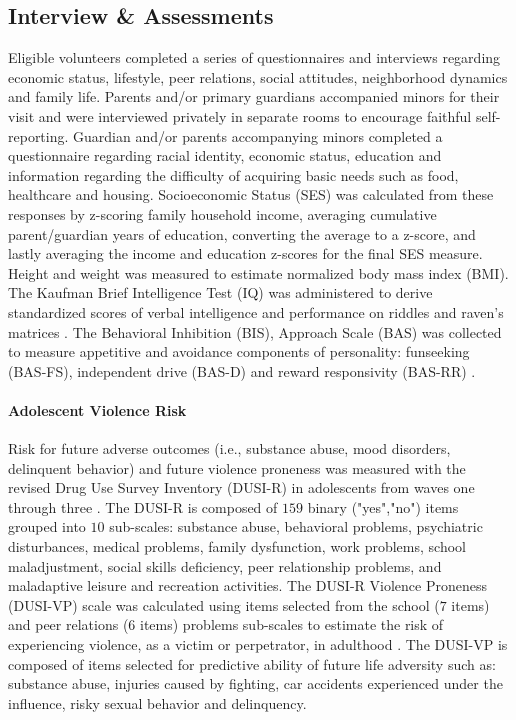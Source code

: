 \documentclass[utf8]{frontiersSCNS} %
\begin{document}
\subsection{Interview \& Assessments}
Eligible volunteers completed a series of questionnaires and interviews regarding economic status, lifestyle, peer relations, social attitudes, neighborhood dynamics and family life. Parents and/or primary guardians accompanied minors for their visit and were interviewed privately in separate rooms to encourage faithful self-reporting. Guardian and/or parents accompanying minors completed a questionnaire regarding racial identity, economic status, education and information regarding the difficulty of acquiring basic needs such as food, healthcare and housing. Socioeconomic Status (SES) was calculated from these responses by z-scoring family household income, averaging cumulative parent/guardian years of education, converting the average to a z-score, and lastly averaging the income and education z-scores for the final SES measure. Height and weight was measured to estimate normalized body mass index (BMI). The Kaufman Brief Intelligence Test (IQ) was administered to derive standardized scores of verbal intelligence and performance on riddles and raven’s matrices \citep{kaufman2004kaufman}. The Behavioral Inhibition (BIS), Approach Scale (BAS) was collected to measure appetitive and avoidance components of personality:  funseeking (BAS-FS), independent drive (BAS-D) and reward responsivity (BAS-RR) \citep{carver1994behavioral}.
\paragraph{Adolescent Violence Risk} 
Risk for future adverse outcomes (i.e., substance abuse, mood disorders, delinquent behavior) and future violence proneness was measured with the revised Drug Use Survey Inventory (DUSI-R) in adolescents from waves one through three  \citep*{tarter1994reliability}. The DUSI-R is composed of $159$ binary ("yes","no") items grouped into $10$ sub-scales: substance abuse, behavioral problems, psychiatric disturbances, medical problems, family dysfunction, work problems, school maladjustment, social skills deficiency, peer relationship problems, and maladaptive leisure and recreation activities. The DUSI-R Violence Proneness (DUSI-VP) scale was calculated using items selected from the school ($7$ items) and peer relations ($6$ items) problems sub-scales to estimate the risk of experiencing violence, as a victim or perpetrator, in adulthood \citep*{kirisci2009violence}. The DUSI-VP is composed of items selected for predictive ability of future life adversity such as: substance abuse, injuries caused by fighting, car accidents experienced under the influence, risky sexual behavior and delinquency.
\end{document}
